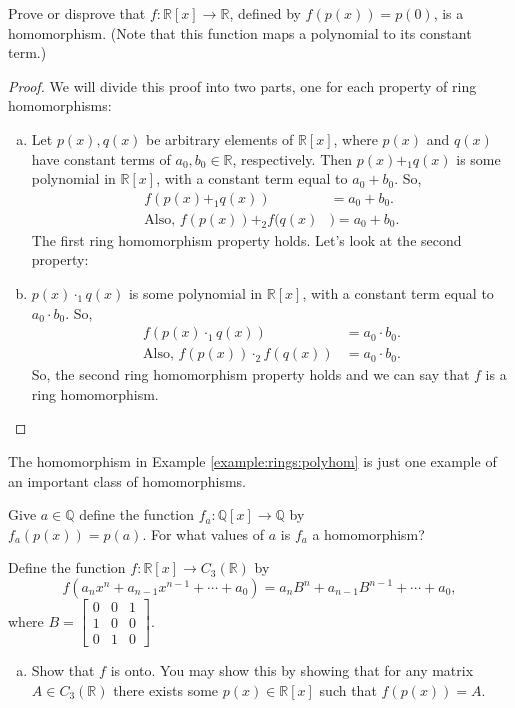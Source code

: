 \begin{example}\label{example:rings:polyhom}
Prove or disprove that $f:{\mathbb R}[x]\rightarrow{\mathbb R}$, defined by $f(p(x))=p(0)$, is a homomorphism.  (Note that this function maps a polynomial to its constant term.)

\begin{proof}
We will divide this proof into two parts, one for each property of ring homomorphisms:
\begin{enumerate}[(a)]
\item Let $p(x),q(x)$ be arbitrary elements of ${\mathbb R}[x]$, where $p(x)$ and $q(x)$ have constant terms of $a_0,b_0\in {\mathbb R}$, respectively.  Then $p(x)+_1q(x)$ is some polynomial in ${\mathbb R}[x]$, with a constant term equal to $a_0+b_0$.  So,
\begin{align*}
f(p(x)+_1q(x))&=a_0+b_0.\\
\text{Also, } f(p(x))+_2f(q(x)&)=a_0+b_0.
\end{align*}
The first ring homomorphism property holds.  Let's look at the second property:
\item  $p(x)\cdot_1q(x)$ is some polynomial in ${\mathbb R}[x]$, with a constant term equal to $a_0\cdot b_0$.  So,
\begin{align*}
f(p(x)\cdot_1q(x))&=a_0\cdot b_0.\\
\text{Also, }f(p(x))\cdot_2f(q(x))&=a_0\cdot b_0.
\end{align*}
So, the second ring homomorphism property holds and we can say that $f$ is a ring homomorphism.
\end{enumerate}
\end{proof}
\end{example}
The homomorphism in Example \ref{example:rings:polyhom} is just one example of an important class of homomorphisms.  

\begin{exercise}
Give $a\in{\mathbb Q}$ define the function $f_a:  {\mathbb Q}[x]\rightarrow{\mathbb Q}$ by\\ $f_a(p(x))=p(a)$.  For what values of $a$ is $f_a$ a homomorphism?
\end{exercise}

\begin{exercise}\label{exercise:rings:R_C_homo}
Define the function $f:{\mathbb R}[x]\rightarrow C_3({\mathbb R})$ by
\[f(a_nx^n+a_{n-1}x^{n-1}+\cdots +a_0)=a_nB^n+a_{n-1}B^{n-1}+\cdots +a_0,\] 
where $B=
\begin{bmatrix}
0 & 0 & 1\\
1 & 0 & 0\\
0 & 1 & 0
\end{bmatrix}.$

\begin{enumerate}[(a)]
\item Show that $f$ is onto.  You may show this by showing that for any matrix $A\in C_3({\mathbb R})$ there exists some $p(x)\in {\mathbb R}[x]$ such that $f(p(x))=A$.
\end{enumerate}
\end{exercise}



